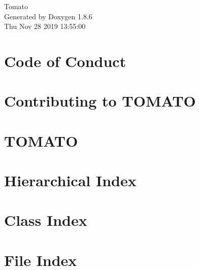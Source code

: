 \documentclass[twoside]{book}
\newcommand{\clearemptydoublepage}{%
  \newpage{\pagestyle{empty}\cleardoublepage}%
}
\begin{document}
\hypersetup{pageanchor=false}
\begin{titlepage}
\vspace*{7cm}
\begin{center}%
{\Large Tomato }\\
\vspace*{1cm}
{\large Generated by Doxygen 1.8.6}\\
\vspace*{0.5cm}
{\small Thu Nov 28 2019 13:55:00}\\
\end{center}
\end{titlepage}
\clearemptydoublepage
\tableofcontents
\clearemptydoublepage
{}
\hypersetup{pageanchor=true}

\chapter{Code of Conduct}
\label{md_codeofconduct}
\hypertarget{md_codeofconduct}{}

\chapter{Contributing to T\-O\-M\-A\-T\-O}
\label{md_contributing}
\hypertarget{md_contributing}{}

\chapter{T\-O\-M\-A\-T\-O}
\label{md__r_e_a_d_m_e}
\hypertarget{md__r_e_a_d_m_e}{}

\chapter{Hierarchical Index}

\chapter{Class Index}

\chapter{File Index}

\end{document}

